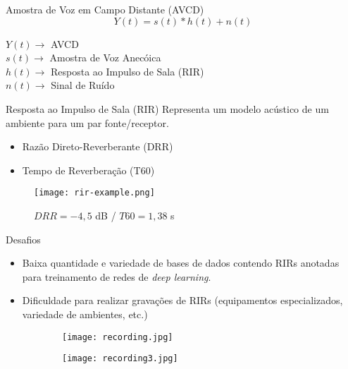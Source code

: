 \begin{frame}{Amostra de Voz em Campo Distante (AVCD)}
    \begin{equation*} \label{eqn:model}
        Y(t) = s(t) \ast h(t) + n(t)
    \end{equation*}
    \vspace{0.5cm}

    $Y(t) \rightarrow$  AVCD \\
    $s(t) \rightarrow$  Amostra de Voz Anecóica \\
    $h(t) \rightarrow$  Resposta ao Impulso de Sala (RIR) \\
    $n(t) \rightarrow$  Sinal de Ruído \\
    
\end{frame}

\begin{frame}{Resposta ao Impulso de Sala (RIR)}
    Representa um modelo acústico de um ambiente para um par fonte/receptor.
    \vspace{0.1cm}

    \begin{itemize}
        \item Razão Direto-Reverberante (DRR)
        \item Tempo de Reverberação (T60)
    \end{itemize}

    \begin{figure} 
        \texttt{[image: rir-example.png]}
        \caption{$DRR = -4,5$ dB / $T60 = 1,38$ s}
        \label{fig:rir-example}
    \end{figure}
\end{frame}

\begin{frame}{Desafios}
    \begin{itemize}
        \item Baixa quantidade e variedade de bases de dados contendo RIRs anotadas para treinamento de redes de \textit{deep learning}.
        \item Dificuldade para realizar gravações de RIRs (equipamentos especializados, variedade de ambientes, etc.)
    \end{itemize}
    \vspace{0.5cm}

    \begin{figure}
        \begin{subfigure}{.45\textwidth}
            \centering
            \texttt{[image: recording.jpg]}
        \end{subfigure}
        \begin{subfigure}{.45\textwidth}
            \centering
            \texttt{[image: recording3.jpg]}
        \end{subfigure}
        \label{fig:recording}
    \end{figure}
\end{frame}